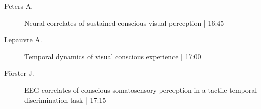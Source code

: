 \begin{symposium}
\begin{description}
                \item [ Peters A.] Neural correlates of sustained conscious visual perception \textcolor{mygray}{ | 16:45}    
                
                \item [ Lepauvre A.] Temporal dynamics of visual conscious experience \textcolor{mygray}{ | 17:00}    
                
                \item [ Förster J.] EEG correlates of conscious somatosensory perception in a tactile temporal discrimination task \textcolor{mygray}{ | 17:15}    
                
            \end{description} 
            \end{symposium}
            